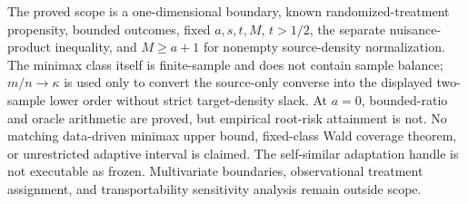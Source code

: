 The proved scope is a one-dimensional boundary, known randomized-treatment propensity, bounded outcomes, fixed \(a,s,t,M\), \(t>1/2\), the separate nuisance-product inequality, and \(M\ge a+1\) for nonempty source-density normalization. The minimax class itself is finite-sample and does not contain sample balance; \(m/n\to\kappa\) is used only to convert the source-only converse into the displayed two-sample lower order without strict target-density slack. At \(a=0\), bounded-ratio and oracle arithmetic are proved, but empirical root-risk attainment is not. No matching data-driven minimax upper bound, fixed-class Wald coverage theorem, or unrestricted adaptive interval is claimed. The self-similar adaptation handle is not executable as frozen. Multivariate boundaries, observational treatment assignment, and transportability sensitivity analysis remain outside scope.